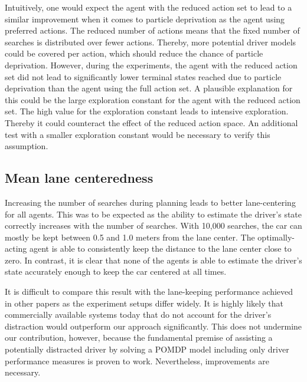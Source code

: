 Intuitively, one would expect the agent with the reduced action set to lead to a similar improvement when it comes to particle deprivation as the agent using preferred actions. The reduced number of actions means that the fixed number of searches is distributed over fewer actions. Thereby, more potential driver models could be covered per action, which should reduce the chance of particle deprivation. However, during the experiments, the agent with the reduced action set did not lead to significantly lower terminal states reached due to particle deprivation than the agent using the full action set. A plausible explanation for this could be the large exploration constant for the agent with the reduced action set. The high value for the exploration constant leads to intensive exploration. Thereby it could counteract the effect of the reduced action space. An additional test with a smaller exploration constant would be necessary to verify this assumption.


\subsection{Mean lane centeredness}

Increasing the number of searches during planning leads to better lane-centering for all agents. This was to be expected as the ability to estimate the driver's state correctly increases with the number of searches. With 10,000 searches, the car can mostly be kept between 0.5 and 1.0 meters from the lane center. The optimally-acting agent is able to consistently keep the distance to the lane center close to zero. In contrast, it is clear that none of the agents is able to estimate the driver's state accurately enough to keep the car centered at all times.

It is difficult to compare this result with the lane-keeping performance achieved in other papers as the experiment setups differ widely. It is highly likely that commercially available systems today that do not account for the driver's distraction would outperform our approach significantly. This does not undermine our contribution, however, because the fundamental premise of assisting a potentially distracted driver by solving a POMDP model including only driver performance measures is proven to work. Nevertheless, improvements are necessary.

